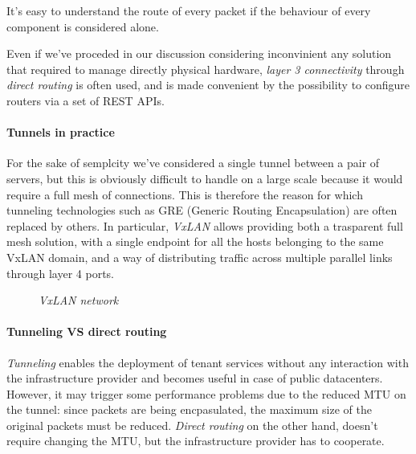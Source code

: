 \begin{note}
    It's easy to understand the route of every packet if the behaviour of every
    component is considered alone.
\end{note}
\begin{note}
    Even if we've proceded in our discussion considering inconvinient any
    solution that required to manage directly physical hardware, \emph{layer 3
    connectivity} through \emph{direct routing} is often used, and is made
    convenient by the possibility to configure routers via a set of REST APIs.
\end{note}

\paragraph{Tunnels in practice}
For the sake of semplcity we've considered a single tunnel between a pair of
servers, but this is obviously difficult to handle on a large scale because
it would require a full mesh of connections. This is therefore the reason for
which tunneling technologies such as GRE (Generic Routing Encapsulation) are
often replaced by others. In particular, \emph{VxLAN} allows providing both a
trasparent full mesh solution, with a single endpoint for all the hosts
belonging to the same VxLAN domain, and a way of distributing traffic across
multiple parallel links through layer 4 ports.

\begin{figure}[h!]
    \centering
    \caption{\emph{VxLAN network}}
\end{figure}

\paragraph{Tunneling VS direct routing}
\emph{Tunneling} enables the deployment of tenant services without any
interaction with the infrastructure provider and becomes useful in case of
public datacenters. However, it may trigger some performance problems due to
the reduced MTU on the tunnel: since packets are being encpasulated, the maximum
size of the original packets must be reduced. \emph{Direct routing} on the other
hand, doesn't require changing the MTU, but the infrastructure provider has to
cooperate.
